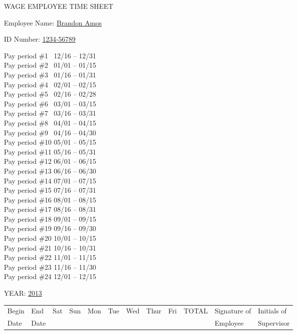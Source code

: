 \documentclass[letterpaper,12pt]{article}
\begin{document}
\begin{center}
WAGE EMPLOYEE TIME SHEET
\end{center}

\hspace{0.5in}Employee Name: \underline{Brandon Amos \hspace{2.5in}}

\vspace{10px}
\hspace{0.5in}ID Number: \hspace{0.25in}
    \underline{1234-56789 \hspace{2.8in}}

\newcommand{\payperiod}[3]{Pay period \##1 \hspace{0.2in} #2 ~ #3\\}
\begin{centering}
\begin{multicols}{2} \noindent
    \payperiod{1~}{12/16 -- 12/31}{\Square}
    \payperiod{2~}{01/01 -- 01/15}{\Square}
    \payperiod{3~}{01/16 -- 01/31}{\Square}
    \payperiod{4~}{02/01 -- 02/15}{\XBox}
    \payperiod{5~}{02/16 -- 02/28}{\Square}
    \payperiod{6~}{03/01 -- 03/15}{\Square}
    \payperiod{7~}{03/16 -- 03/31}{\Square}
    \payperiod{8~}{04/01 -- 04/15}{\Square}
    \payperiod{9~}{04/16 -- 04/30}{\Square}
    \payperiod{10}{05/01 -- 05/15}{\Square}
    \payperiod{11}{05/16 -- 05/31}{\Square}
    \payperiod{12}{06/01 -- 06/15}{\Square}
    \vfill \columnbreak \noindent
    \payperiod{13}{06/16 -- 06/30}{\Square}
    \payperiod{14}{07/01 -- 07/15}{\Square}
    \payperiod{15}{07/16 -- 07/31}{\Square}
    \payperiod{16}{08/01 -- 08/15}{\Square}
    \payperiod{17}{08/16 -- 08/31}{\Square}
    \payperiod{18}{09/01 -- 09/15}{\Square}
    \payperiod{19}{09/16 -- 09/30}{\Square}
    \payperiod{20}{10/01 -- 10/15}{\Square}
    \payperiod{21}{10/16 -- 10/31}{\Square}
    \payperiod{22}{11/01 -- 11/15}{\Square}
    \payperiod{23}{11/16 -- 11/30}{\Square}
    \payperiod{24}{12/01 -- 12/15}{\Square}
\end{multicols}
\end{centering}

YEAR: \underline{2013}

\begin{table}[h]
\center
\begin{tabular}{*{9}{|C}|D|E|E|} \hline
    Begin & End & Sat & Sun & Mon & Tue & Wed & Thur & Fri & TOTAL &
        Signature of & Initials of \\
    Date & Date &&&&&&&&& Employee & Supervisor \\ \hline
    
\end{tabular}
\end{table}
\end{document}
